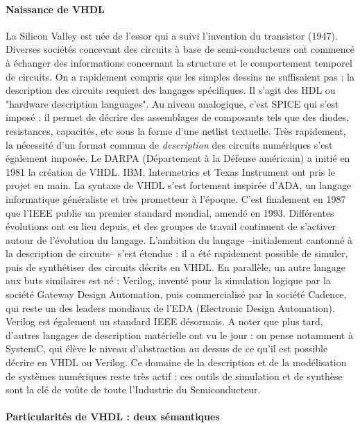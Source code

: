 \paragraph{Naissance de VHDL}

La Silicon Valley est née de l'essor qui a suivi l'invention du transistor (1947). Diverses sociétés concevant
des circuits à base de semi-conducteurs ont commencé à échanger des informations concernant la structure et le comportement temporel de circuits. On a rapidement compris
que les simples dessins ne suffisaient pas : la description des circuits requiert des langages spécifiques. Il s'agit des HDL ou "hardware description languages".
Au niveau analogique, c'est SPICE qui s'est imposé : il permet de décrire des assemblages de composants tels que des diodes, resistances, capacités, etc sous la forme d'une netlist textuelle.
Très rapidement, la nécessité d'un format commun de {\it description} des circuits numériques s'est également imposée. Le DARPA (Département à la Défense américain) a initié en 1981 la création
de VHDL. IBM, Intermetrics et Texas Instrument ont pris le projet en main. La syntaxe de VHDL s'est fortement inspirée d'ADA, un langage informatique généraliste et très prometteur à l'époque. C'est finalement en 1987 que l'IEEE publie un premier standard mondial,
amendé en 1993. Différentes évolutions ont eu lieu depuis, et des groupes de travail continuent de s'activer autour de l'évolution du langage. L'ambition du langage --initialement cantonné
à la description de circuits-- s'est étendue : il a été rapidement possible de simuler, puis de synthétiser des circuits décrits en VHDL. En parallèle, un autre langage aux buts similaires est né :  Verilog, inventé pour la simulation logique par la société Gateway Design Automation,
puis commercialisé par la société Cadence, qui reste un des leaders mondiaux de l'EDA (Electronic Design
Automation). Verilog est également un standard IEEE désormais. A noter que plus tard, d'autres langages de description matérielle ont vu le jour : on pense notamment à SystemC, qui élève le niveau d'abstraction
au dessus de ce qu'il est possible décrire en VHDL ou Verilog.
Ce domaine de la description et de la modélisation de systèmes numériques reste très actif : ces outils de simulation et de synthèse sont la clé de voûte de toute l'Industrie du Semiconducteur.

\paragraph{Particularités de VHDL : deux sémantiques}

